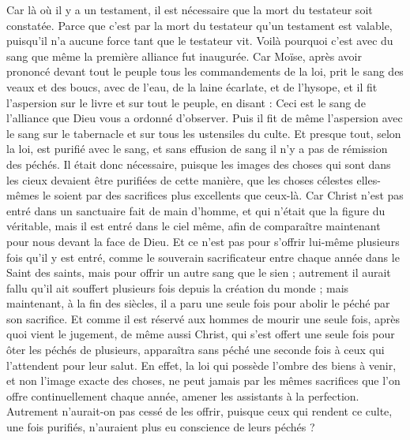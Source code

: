 \begin{multicols}{2}
Car là où il y a un testament, il est nécessaire que la mort du testateur soit constatée.
Parce que c'est par la mort du testateur qu'un testament est valable, puisqu’il n'a aucune force tant que le testateur vit.
Voilà pourquoi c’est avec du sang que même la première alliance fut inaugurée.
Car Moïse, après avoir prononcé devant tout le peuple tous les commandements de la loi, prit le sang des veaux et des boucs, avec de l'eau, de la laine écarlate, et de l'hysope, et il fit l’aspersion sur le livre et sur tout le peuple, en disant :
Ceci est le sang de l’alliance que Dieu vous a ordonné d'observer.
Puis il fit de même l’aspersion avec le sang sur le tabernacle et sur tous les ustensiles du culte.
Et presque tout, selon la loi, est purifié avec le sang, et sans effusion de sang il n’y a pas de rémission des péchés.
Il était donc nécessaire, puisque les images des choses qui sont dans les cieux devaient être purifiées de cette manière, que les choses célestes elles-mêmes le soient par des sacrifices plus excellents que ceux-là.
Car Christ n'est pas entré dans un sanctuaire fait de main d’homme, et qui n’était que la figure du véritable, mais il est entré dans le ciel même, afin de comparaître maintenant pour nous devant la face de Dieu.
Et ce n’est pas pour s’offrir lui-même plusieurs fois qu’il y est entré, comme le souverain sacrificateur entre chaque année dans le Saint des saints, mais pour offrir un autre sang que le sien ;
autrement il aurait fallu qu'il ait souffert plusieurs fois depuis la création du monde ; mais maintenant, à la fin des siècles, il a paru une seule fois pour abolir le péché par son sacrifice.
Et comme il est réservé aux hommes de mourir une seule fois, après quoi vient le jugement,
de même aussi Christ, qui s’est offert une seule fois pour ôter les péchés de plusieurs, apparaîtra sans péché une seconde fois à ceux qui l'attendent pour leur salut.
\VerseOne{}En effet, la loi qui possède l'ombre des biens à venir, et non l’image exacte des choses, ne peut jamais par les mêmes sacrifices que l'on offre continuellement chaque année, amener les assistants à la perfection.
Autrement n’aurait-on pas cessé de les offrir, puisque ceux qui rendent ce culte, une fois purifiés, n’auraient plus eu conscience de leurs péchés ?

\end{multicols}
